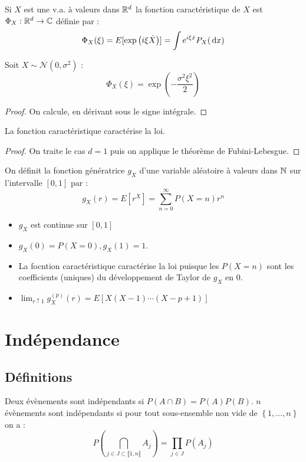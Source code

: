 \documentclass{cours}
\begin{document}
\begin{definition}
    Si $X$ est une v.a. à valeurs dans $\mathbb{R}^{d}$ la fonction caractéristique de $X$ est $\Phi_{X} : \mathbb{R}^{d} \rightarrow \mathbb{C}$ définie par :
    \[
        \Phi_{X}(\xi) = E[\exp\left(i\xi \dot X\right)] = \int e^{i\xi \dot x}P_{X}({\rm \, d} x)
    \]
\end{definition}

\begin{lemma}
    Soit $X \sim \mathcal{N}(0, \sigma^{2})$ :
    \[
        \Phi_{X}(\xi) = \exp\left(-\frac{\sigma^{2}\xi^{2}}{2}\right)
    \]
\end{lemma}
\begin{proof}
    On calcule, en dérivant sous le signe intégrale.
\end{proof}

\begin{theorem}
    La fonction caractéristique caractérise la loi.
\end{theorem}
\begin{proof}
    On traite le cas $d = 1$ puis on applique le théorème de Fubini-Lebesgue.
\end{proof}

\begin{definition}
    On définit la fonction génératrice $g_{X}$ d'une variable aléatoire à valeurs dans $\mathbb{N}$ sur l'intervalle $\left[0, 1\right]$ par :
    \[
        g_{X}(r) = E[r^{X}] = \sum_{n = 0}^{\infty}P(X = n)r^{n}
    \]
\end{definition}

\begin{proposition}
    \begin{itemize}
        \item $g_{X}$ est continue sur $\left[0, 1\right]$
        \item $g_{X}(0) = P(X = 0), g_{X}(1) = 1$.
        \item La focntion caractéristique caractérise la loi puisque les $P(X = n)$ sont les coefficients (uniques) du développement de Taylor de $g_{X}$ en $0$.
        \item $\lim_{r \uparrow 1}g_{X}^{(p)}(r) = E\left[X(X - 1)\cdots(X - p + 1)\right]$
    \end{itemize}
\end{proposition}

\section{Indépendance}
\subsection{Définitions}
\begin{definition}
    Deux évènements sont indépendants si $P(A\cap B) = P(A)P(B)$. $n$ évènements sont indépendants si pour tout sous-ensemble non vide de $\left\{1, \ldots, n\right\}$ on a :
    \[
        P\left(\bigcap_{j \in J \subset \llbracket 1, n\rrbracket} A_{j}\right) = \prod_{j \in J} P(A_{j})
    \]
\end{definition}
\end{document}
